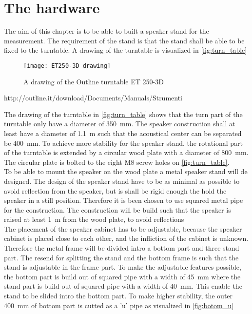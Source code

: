 \section{The hardware}
The aim of this chapter is to be able to built a speaker stand for the measurement. The requirement of the stand is that the stand shall be able to be fixed to the turntable. A drawing of the turntable is visualized in \autoref{fig:turn_table}


 \begin{figure}[H]
	\centering
	\texttt{[image: ET250-3D\_drawing]}
	\caption{A drawing of the Outline turntable ET 250-3D}
		\label{fig:turn_table}
\end{figure}

http://outline.it/download/Documents/Manuals/Strumenti%

The drawing of the turntable in \autoref{fig:turn_table} shows that the turn part of the turntable only have a diameter of \SI{350}{\milli\meter}. The speaker construction shall at least have a diameter of \SI{1.1}{\meter} such that the acoustical center can be separated be \SI{400}{\milli\meter}. To achieve more stability for the speaker stand, the rotational part of the turntable is extended by a circular wood plate with a diameter of \SI{800}{\milli\meter}. The circular plate is bolted to the eight M8 screw holes on  \autoref{fig:turn_table}. \\
To be able to mount the speaker on the wood plate a metal speaker stand will de designed. The design of the speaker stand have to be as minimal as possible to avoid reflection from the speaker, but is shall be rigid enough the hold the speaker in a still position. Therefore it is been chosen to use squared metal pipe for the construction. The construction will be build such that the speaker is raised at least \SI{1}{\meter} from the wood plate, to avoid reflections\\
The placement of the speaker cabinet has to be adjustable, because the speaker cabinet is placed close to each other, and the infliction of the cabinet is unknown. Therefore the metal frame will be divided intro a bottom part and three stand part. The resend for splitting the stand and the bottom frame is such that the stand is adjustable in the frame part. To make the adjustable features possible, the bottom part is build out of squared pipe with a width of \SI{45}{\milli\meter} where the stand part is build out of squared pipe with a width of \SI{40}{\milli\meter}. This enable the stand to be slided intro the bottom part. To make higher stability, the outer \SI{400}{\milli\meter} of bottom part is cutted as a 'u' pipe as visualized in \autoref{fig:botom_u}

